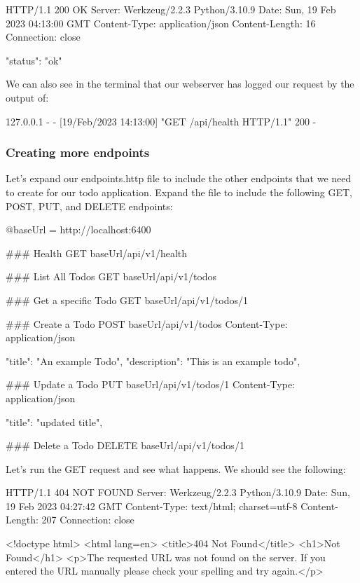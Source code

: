\documentclass{csse4400}
\begin{document}
\begin{code}[language=json,numbers=none]{}
  HTTP/1.1 200 OK
  Server: Werkzeug/2.2.3 Python/3.10.9
  Date: Sun, 19 Feb 2023 04:13:00 GMT
  Content-Type: application/json
  Content-Length: 16
  Connection: close
    
  {
    "status": "ok"
  }
\end{code}

We can also see in the terminal that our webserver has logged our request by the output of:

\begin{code}[language=bash,numbers=none]{}
  127.0.0.1 - - [19/Feb/2023 14:13:00] "GET /api/health HTTP/1.1" 200 -
\end{code}

\subsubsection{Creating more endpoints}

Let's expand our endpoints.http file to include the other endpoints that we need to create for our todo application. Expand the file to include the following GET, POST, PUT, and DELETE endpoints:

\begin{code}[numbers=none]{}
  @baseUrl = http://localhost:6400

  ### Health
  GET {{baseUrl}}/api/v1/health
  
  ### List All Todos
  GET {{baseUrl}}/api/v1/todos
  
  ### Get a specific Todo
  GET {{baseUrl}}/api/v1/todos/1
  
  ### Create a Todo
  POST {{baseUrl}}/api/v1/todos
  Content-Type: application/json
  
  {
      "title": "An example Todo",
      "description": "This is an example todo",
  }
  
  ### Update a Todo
  PUT {{baseUrl}}/api/v1/todos/1
  Content-Type: application/json
  
  {
      "title": "updated title",
  }
  
  ### Delete a Todo
  DELETE {{baseUrl}}/api/v1/todos/1
  
\end{code}

Let's run the GET request and see what happens. We should see the following:

\begin{code}[language=html,numbers=none]{}
  HTTP/1.1 404 NOT FOUND
  Server: Werkzeug/2.2.3 Python/3.10.9
  Date: Sun, 19 Feb 2023 04:27:42 GMT
  Content-Type: text/html; charset=utf-8
  Content-Length: 207
  Connection: close
  
  <!doctype html>
  <html lang=en>
  <title>404 Not Found</title>
  <h1>Not Found</h1>
  <p>The requested URL was not found on the server. If you entered the URL manually please check your spelling and try again.</p>  
\end{code}
\end{document}

